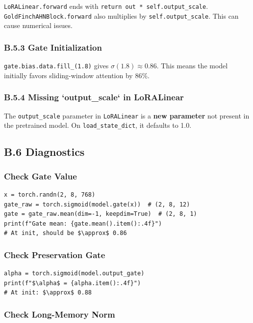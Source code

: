 \texttt{LoRALinear.forward} ends with \texttt{return out * self.output\_scale}. 
\texttt{GoldFinchAHNBlock.forward} also multiplies by \texttt{self.output\_scale}. This 
can cause numerical issues.

\subsubsection{B.5.3 Gate Initialization}

\texttt{gate.bias.data.fill\_(1.8)} gives $\sigma(1.8) \approx 0.86$. This means 
the model initially favors sliding-window attention by 86\%.

\subsubsection{B.5.4 Missing `output\_scale` in LoRALinear}

The \texttt{output\_scale} parameter in \texttt{LoRALinear} is a \textbf{new parameter} not 
present in the pretrained model. On \texttt{load\_state\_dict}, it defaults to 1.0.

\subsection{B.6 Diagnostics}

\subsubsection{Check Gate Value}

\begin{lstlisting}
x = torch.randn(2, 8, 768)
gate_raw = torch.sigmoid(model.gate(x))  # (2, 8, 12)
gate = gate_raw.mean(dim=-1, keepdim=True)  # (2, 8, 1)
print(f"Gate mean: {gate.mean().item():.4f}")
# At init, should be $\approx$ 0.86
\end{lstlisting}

\subsubsection{Check Preservation Gate}

\begin{lstlisting}
alpha = torch.sigmoid(model.output_gate)
print(f"$\alpha$ = {alpha.item():.4f}")
# At init: $\approx$ 0.88
\end{lstlisting}

\subsubsection{Check Long-Memory Norm}

